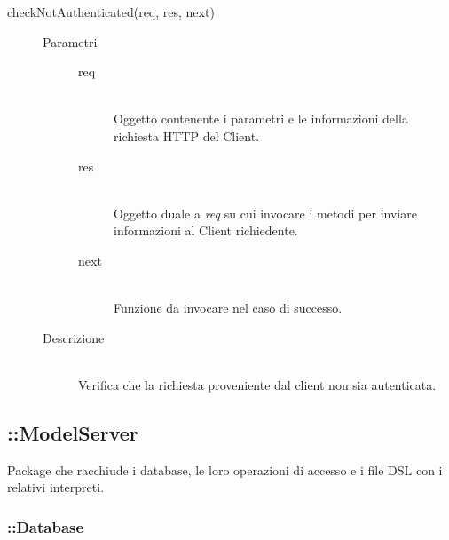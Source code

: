 \begin{description}
\begin{description}
     \item[checkNotAuthenticated(req, res, next)] \hfill 
     \begin{description}
      \item[Parametri] \hfill
      \begin{description}
       \item[req] \hfill \\
	    Oggetto contenente i parametri e le informazioni della richiesta HTTP del Client.
	   \item[res] \hfill \\
	    Oggetto duale a \textit{req} su cui invocare i metodi per inviare informazioni al Client richiedente.
       \item[next] \hfill \\
        Funzione da invocare nel caso di successo.
      \end{description}
      \item[Descrizione] \hfill \\
      Verifica che la richiesta proveniente dal client non sia autenticata.
     \end{description}
  \end{description}
\end{description}

\subsection{::ModelServer}
Package che racchiude i database, le loro operazioni di accesso e i file DSL con i relativi interpreti.

\subsubsection{::Database}
